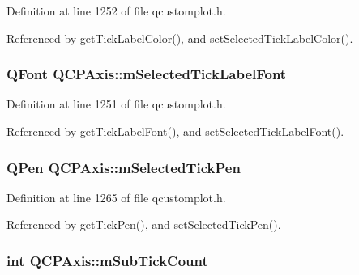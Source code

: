 Definition at line 1252 of file qcustomplot.\+h.



Referenced by get\+Tick\+Label\+Color(), and set\+Selected\+Tick\+Label\+Color().

\hypertarget{class_q_c_p_axis_a4f2e4919da9615dac612662c249b1119}{}
\subsubsection[{m\+Selected\+Tick\+Label\+Font}]{\setlength{\rightskip}{0pt plus 5cm}Q\+Font Q\+C\+P\+Axis\+::m\+Selected\+Tick\+Label\+Font\hspace{0.3cm}{\ttfamily [protected]}}\label{class_q_c_p_axis_a4f2e4919da9615dac612662c249b1119}


Definition at line 1251 of file qcustomplot.\+h.



Referenced by get\+Tick\+Label\+Font(), and set\+Selected\+Tick\+Label\+Font().

\hypertarget{class_q_c_p_axis_a9524593dbc75a5c5b29dbd1cb4b37df5}{}
\subsubsection[{m\+Selected\+Tick\+Pen}]{\setlength{\rightskip}{0pt plus 5cm}Q\+Pen Q\+C\+P\+Axis\+::m\+Selected\+Tick\+Pen\hspace{0.3cm}{\ttfamily [protected]}}\label{class_q_c_p_axis_a9524593dbc75a5c5b29dbd1cb4b37df5}


Definition at line 1265 of file qcustomplot.\+h.



Referenced by get\+Tick\+Pen(), and set\+Selected\+Tick\+Pen().

\hypertarget{class_q_c_p_axis_ad70198e6ae2801fc409bc3caec707da9}{}
\subsubsection[{m\+Sub\+Tick\+Count}]{\setlength{\rightskip}{0pt plus 5cm}int Q\+C\+P\+Axis\+::m\+Sub\+Tick\+Count\hspace{0.3cm}{\ttfamily [protected]}}\label{class_q_c_p_axis_ad70198e6ae2801fc409bc3caec707da9}



